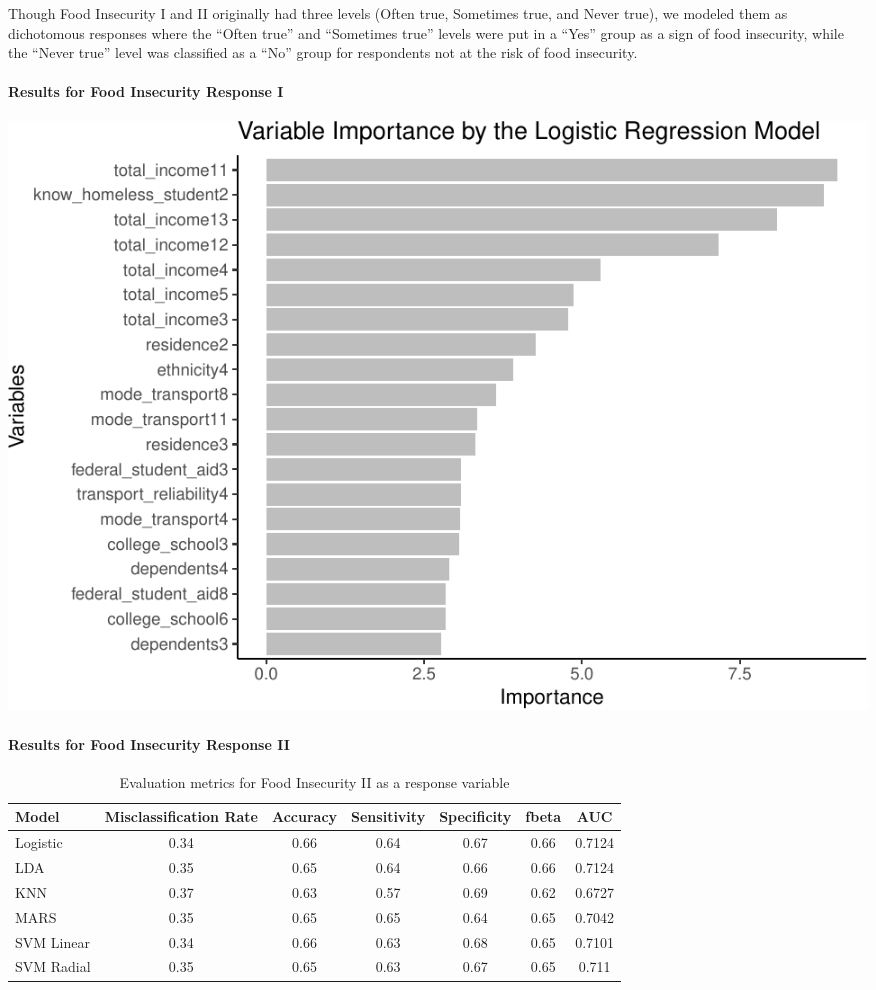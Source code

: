 \documentclass[
  10pt,
]{article}
\begin{document}
Though Food Insecurity I and II originally had three levels (Often true, Sometimes true, and Never true), we modeled them as dichotomous responses where the ``Often true'' and ``Sometimes true'' levels were put in a ``Yes'' group as a sign of food insecurity, while the ``Never true'' level was classified as a ``No'' group for respondents not at the risk of food insecurity.

\hypertarget{results-for-food-insecurity-response-i}{%
\paragraph{Results for Food Insecurity Response I}\label{results-for-food-insecurity-response-i}}

\includegraphics{phase2_report_files/figure-latex/unnamed-chunk-14-1}

\hypertarget{results-for-food-insecurity-response-ii}{%
\paragraph{Results for Food Insecurity Response II}\label{results-for-food-insecurity-response-ii}}

\begin{table}[H]

\caption{\label{tab:unnamed-chunk-15}Evaluation metrics for Food Insecurity II  as a response variable}
\centering
\fontsize{12}{14}\selectfont
\begin{tabular}[t]{lcccccc}
\toprule
Model & Misclassification Rate & Accuracy & Sensitivity & Specificity & fbeta & AUC\\
\midrule
Logistic & 0.34 & 0.66 & 0.64 & 0.67 & 0.66 & 0.7124\\
LDA & 0.35 & 0.65 & 0.64 & 0.66 & 0.66 & 0.7124\\
KNN & 0.37 & 0.63 & 0.57 & 0.69 & 0.62 & 0.6727\\
MARS & 0.35 & 0.65 & 0.65 & 0.64 & 0.65 & 0.7042\\
SVM Linear & 0.34 & 0.66 & 0.63 & 0.68 & 0.65 & 0.7101\\
SVM Radial & 0.35 & 0.65 & 0.63 & 0.67 & 0.65 & 0.711\\
\bottomrule
\end{tabular}
\end{table}
\end{document}
